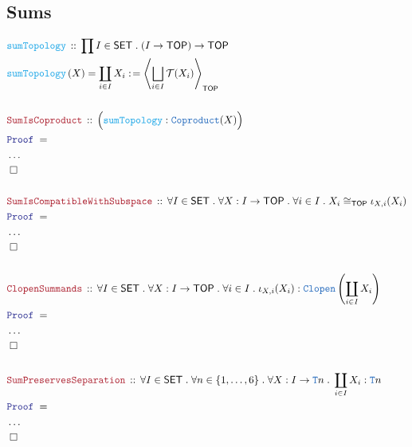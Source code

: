 \documentclass[12pt]{scrartcl}
\newcommand{\TYPE}[1]{\textcolor{NavyBlue}{\mathtt{#1}}}
\newcommand{\FUNC}[1]{\textcolor{Cerulean}{\mathtt{#1}}}
\newcommand{\LOGIC}[1]{\textcolor{Blue}{\mathtt{#1}}}
\newcommand{\THM}[1]{\textcolor{Maroon}{\mathtt{#1}}}
\renewcommand{\.}{\; . \;}
\newcommand{\de}{: \kern 0.1pc =}
\newcommand{\Act}[1]{\left( #1 \right)}
\newcommand{\Theorem}[2]{& \THM{#1} \, :: \, #2 \\ & \Proof = \\ }
\newcommand{\DeclareFunc}[2]{& \FUNC{#1} \, :: \, #2 \\}
\newcommand{\DefineNamedFunc}[4]{&  \FUNC{#1}\Act{#2} = #3 \de #4 \\}
\newcommand{\Page}[1]{ \begin{align*} #1 \end{align*}   }
\newcommand{\NoProof}{ & \ldots \\ \EndProof}
\newcommand{\QED}{\; \square}
\newcommand{\EndProof}{& \QED \\}
\newcommand{\Proof}{\LOGIC{Proof} \; }
\newcommand{\SET}{\mathsf{SET}}
\newcommand{\TOP}{\mathsf{TOP}}
\newcommand{\T}{\mathcal{T}}
\begin{document}
\subsection{Sums}
\Page{
	\DeclareFunc{sumTopology}
	{
		\prod I \in \SET \. 
		( I \to \TOP) \to \TOP 
	}
	\DefineNamedFunc{sumTopology}{X}{\coprod_{i \in I} X_i}{ \left\langle \bigsqcup_{i \in I} \T(X_i)  \right\rangle_{\TOP}} 
	\\
	\Theorem{SumIsCoproduct}{\Big(\FUNC{sumTopology} : \TYPE{Coproduct}(X)\Big)}
	\NoProof
	\\
	\Theorem{SumIsCompatibleWithSubspace}
	{
		\forall I \in \SET \.
		\forall X : I \to \TOP \.
		\forall i \in I \. 
		X_i \cong_{\TOP} \iota_{X,i}(X_i)
	}
	\NoProof
	\\
	\Theorem{ClopenSummands}
	{
		\forall I \in \SET \.
		\forall X : I \to \TOP \.
		\forall i \in I \.
		\iota_{X,i}(X_i) : \TYPE{Clopen}\left( \coprod_{i \in I}  X_i \right) 
	}
	\NoProof
	\\
	\Theorem{SumPreservesSeparation}
	{
		\forall I \in \SET \.
		\forall n \in \{1,\ldots,6\} \.
		\forall X : I \to \TYPE{T}n \. 
		\coprod_{i \in I} X_i  : \TYPE{T}n
	}
	\NoProof
}
\newpage
\end{document}
